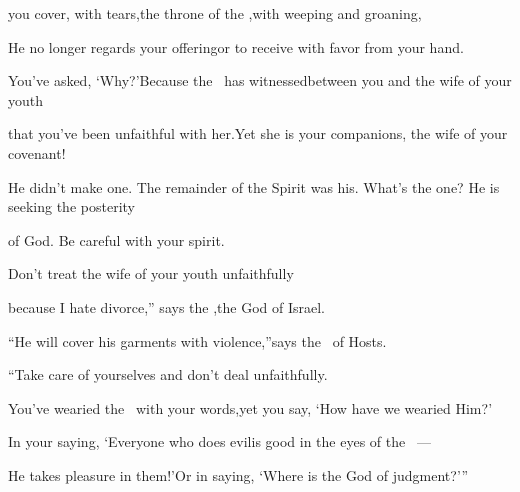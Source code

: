 \begin{inparaenum}
  \pb you cover, with tears,\pa the throne of the \lord,\pa with weeping and groaning,%
  
  \pb He no longer regards your offering\pa or to receive with favor from your hand.%
  
  \pa {} You've asked, `Why?'\pa Because the \lord\ has witnessed\pa between you and the wife of your youth%
  
  \pb that you've been unfaithful with her.\pa Yet she is your companions, the wife of your covenant!%
  
  \pa {}%
  He didn't make one. The remainder of the Spirit was his. What's the one? He is seeking the posterity%
  
  \pc of God. Be careful with your spirit.%
  
  \pe%
  Don't treat the wife of your youth unfaithfully%
  
  \pa {} because I hate divorce,''%
  \pa says the \lord,\pa the God of Israel.%
  
  \pb ``He will cover his garments with violence,''\pa says the \lord\ of Hosts.%
  
  \pc ``Take care of yourselves%
  and don't deal unfaithfully.%
  
  \pa {} You've wearied the \lord\ with your words,\pa yet you say, `How have we wearied Him?'%
  
  \pb In your saying, `Everyone who does evil\pa is good in the eyes of the \lord~---%
  
  \pb He takes pleasure in them!'\pa Or in saying, `Where is the God of judgment?'\thinspace''%
\end{inparaenum}
